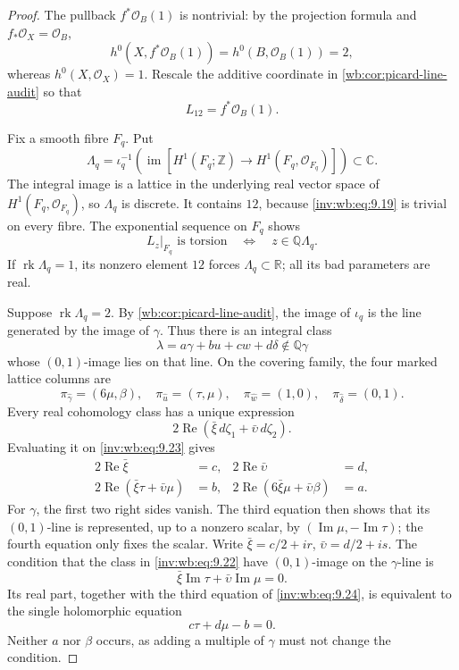 \begin{proof}
The pullback \(f^*\mathcal O_B(1)\) is nontrivial: by the projection
formula and \(f_*\mathcal O_X=\mathcal O_B\),
\[
 h^0(X,f^*\mathcal O_B(1))=h^0(B,\mathcal O_B(1))=2,
\]
whereas \(h^0(X,\mathcal O_X)=1\).  Rescale the additive coordinate in
\cref{wb:cor:picard-line-audit} so that
\[
 L_{12}=f^*\mathcal O_B(1).
\tag{WBAPII.9.19}\label{inv:wb:eq:9.19}
\]

Fix a smooth fibre \(F_q\).  Put
\[
 \Lambda_q=\iota_q^{-1}\!\left(
 \operatorname{im}[H^1(F_q;\mathbb Z)\to
 H^1(F_q,\mathcal O_{F_q})]\right)\subset\mathbb C.
\tag{WBAPII.9.20}\label{inv:wb:eq:9.20}
\]
The integral image is a lattice in the underlying real vector space of
\(H^1(F_q,\mathcal O_{F_q})\), so \(\Lambda_q\) is discrete.  It contains
\(12\), because \eqref{inv:wb:eq:9.19} is trivial on every fibre.  The exponential
sequence on \(F_q\) shows
\[
 L_z|_{F_q}\text{ is torsion}
 \quad\Longleftrightarrow\quad z\in\mathbb Q\Lambda_q.
\tag{WBAPII.9.21}\label{inv:wb:eq:9.21}
\]
If \(\operatorname{rk}\Lambda_q=1\), its nonzero element \(12\) forces
\(\Lambda_q\subset\mathbb R\); all its bad parameters are real.

Suppose \(\operatorname{rk}\Lambda_q=2\).  By
\cref{wb:cor:picard-line-audit}, the image of \(\iota_q\) is the line
generated by the image of \(\gamma\).  Thus there is an integral class
\[
 \lambda=a\gamma+bu+cw+d\delta\notin\mathbb Q\gamma
\tag{WBAPII.9.22}\label{inv:wb:eq:9.22}
\]
whose \((0,1)\)-image lies on that line.  On the covering family, the four
marked lattice columns are
\[
 \pi_{\widehat\gamma}=(6\mu,\beta),\quad
 \pi_{\widehat u}=(\tau,\mu),\quad
 \pi_{\widehat w}=(1,0),\quad
 \pi_{\widehat\delta}=(0,1).
\tag{WBAPII.9.23}\label{inv:wb:eq:9.23}
\]
Every real cohomology class has a unique expression
\[
 2\operatorname{Re}(\bar\xi\,d\zeta_1+
                       \bar\upsilon\,d\zeta_2).
\]
Evaluating it on \eqref{inv:wb:eq:9.23} gives
\[
\begin{aligned}
2\operatorname{Re}\bar\xi&=c,&
2\operatorname{Re}\bar\upsilon&=d,\\
2\operatorname{Re}(\bar\xi\tau+\bar\upsilon\mu)&=b,&
2\operatorname{Re}(6\bar\xi\mu+\bar\upsilon\beta)&=a.
\end{aligned}
\tag{WBAPII.9.24}\label{inv:wb:eq:9.24}
\]
For \(\gamma\), the first two right sides vanish.  The third equation then
shows that its \((0,1)\)-line is represented, up to a nonzero scalar, by
\((\operatorname{Im}\mu,-\operatorname{Im}\tau)\); the fourth equation
only fixes the scalar.  Write
\(\bar\xi=c/2+ir\), \(\bar\upsilon=d/2+is\).  The condition that the class
in \eqref{inv:wb:eq:9.22} have \((0,1)\)-image on the \(\gamma\)-line is
\[
 \bar\xi\operatorname{Im}\tau+
 \bar\upsilon\operatorname{Im}\mu=0.
\]
Its real part, together with the third equation of \eqref{inv:wb:eq:9.24}, is equivalent
to the single holomorphic equation
\[
 c\tau+d\mu-b=0.
\tag{WBAPII.9.25}\label{inv:wb:eq:9.25}
\]
Neither \(a\) nor \(\beta\) occurs, as adding a multiple of \(\gamma\)
must not change the condition.


\end{proof}
